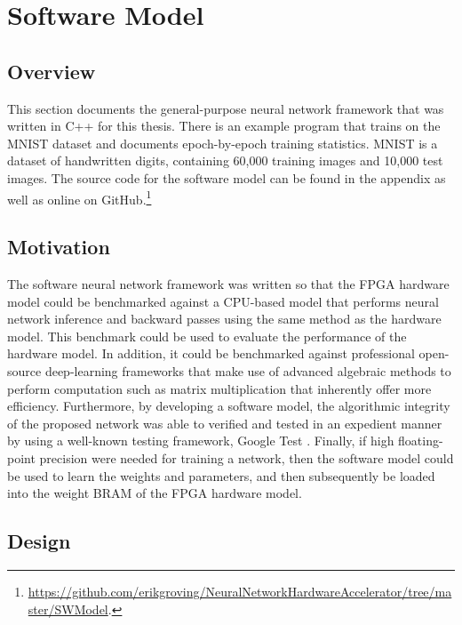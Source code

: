 \chapter{Software Model}
\label{ch-sw-model}
\section{Overview}
This section documents the general-purpose neural network framework that was written in C++ for this thesis. There is an example program that trains on the MNIST dataset and documents epoch-by-epoch training statistics. MNIST is a dataset of handwritten digits, containing 60,000 training images and 10,000 test images. The source code for the software model can be found in the appendix as well as online on GitHub.\footnote{\url{
https://github.com/erikgroving/NeuralNetworkHardwareAccelerator/tree/master/SWModel}.}


\section{Motivation}
The software neural network framework was written so that the FPGA hardware model could be benchmarked against a CPU-based model that performs neural network inference and backward passes using the same method as the hardware model. This benchmark could be used to evaluate the performance of the hardware model. In addition, it could be benchmarked against professional open-source deep-learning frameworks that make use of advanced algebraic methods to perform computation such as matrix multiplication that inherently offer more efficiency. Furthermore, by developing a software model, the algorithmic integrity of the proposed network was able to verified and tested in an expedient manner by using a well-known testing framework, Google Test \cite{gtest}. Finally, if high floating-point precision were needed for training a network, then the software model could be used to learn the weights and parameters, and then subsequently be loaded into the weight BRAM of the FPGA hardware model.

\section{Design}
